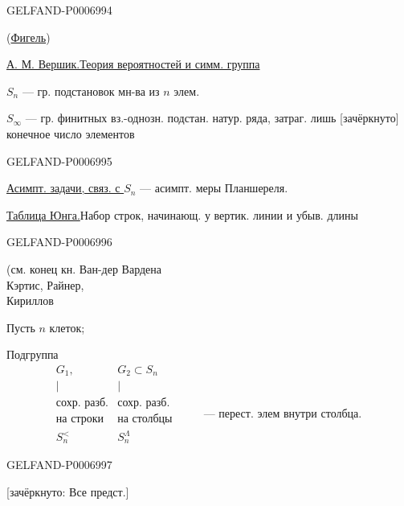\begin{GelfandAdjacentEvidence}{GELFAND-P000699}{4}


(\underline{Фигель})

\underline{А. М. Вершик.}\qquad\underline{Теория вероятностей и симм. группа}

\(S_n\) --- гр. подстановок мн-ва из \(n\) элем.

\(S_\infty\) --- гр. финитных вз.-однозн. подстан. натур. ряда, затраг. лишь [зачёркнуто] конечное число элементов
\end{GelfandAdjacentEvidence}
\begin{GelfandAdjacentEvidence}{GELFAND-P000699}{5}


\underline{Асимпт. задачи, связ. с \(S_n\)} --- асимпт. меры Планшереля.

\underline{Таблица Юнга.}\qquad Набор строк, начинающ. у вертик. линии и убыв. длины

\end{GelfandAdjacentEvidence}
\begin{GelfandAdjacentEvidence}{GELFAND-P000699}{6}


(см. конец кн. Ван-дер Вардена\\
Кэртис, Райнер,\\
Кириллов

Пусть \(n\) клеток;

Подгруппа
\[
\begin{array}{cc}
G_1,&G_2\subset S_n\\
\vert&\vert\\
\text{сохр. разб.}&\text{сохр. разб.}\\
\text{на строки}&\text{на столбцы}\\
S_n^{<}&S_n^\Lambda
\end{array}
\qquad
\begin{array}{l}
\\ \\ \\ \\
\text{--- перест. элем внутри столбца.}
\end{array}
\]
\end{GelfandAdjacentEvidence}
\begin{GelfandAdjacentEvidence}{GELFAND-P000699}{7}


[зачёркнуто: Все предст.]
\end{GelfandAdjacentEvidence}



